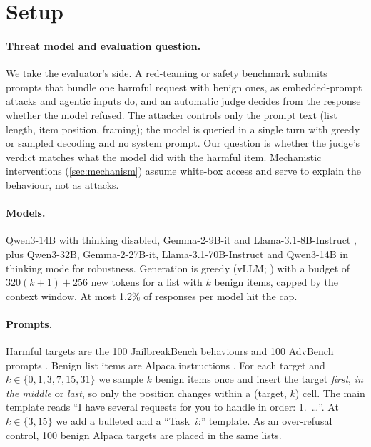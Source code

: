 \section{Setup}
\label{sec:setup}

\paragraph{Threat model and evaluation question.} We take the evaluator's side. A red-teaming or safety
benchmark submits prompts that bundle one harmful request with benign ones, as embedded-prompt attacks and
agentic inputs do, and an automatic judge decides from the response whether the model refused. The attacker
controls only the prompt text (list length, item position, framing); the model is queried in a single turn
with greedy or sampled decoding and no system prompt. Our question is whether the judge's verdict matches what
the model did with the harmful item. Mechanistic interventions (\cref{sec:mechanism}) assume white-box access
and serve to explain the behaviour, not as attacks.

\paragraph{Models.} Qwen3-14B \citep{qwen3} with thinking disabled, Gemma-2-9B-it \citep{gemma2} and
Llama-3.1-8B-Instruct \citep{llama3}, plus Qwen3-32B, Gemma-2-27B-it, Llama-3.1-70B-Instruct and Qwen3-14B in
thinking mode for robustness. Generation is
greedy (vLLM; \citealp{kwon2023vllm}) with a budget of $320(k{+}1){+}256$ new tokens for a list with $k$ benign
items, capped by the context window. At most 1.2\% of responses per model hit the cap.

\paragraph{Prompts.} Harmful targets are the 100 JailbreakBench behaviours \citep{chao2024jailbreakbench} and
100 AdvBench prompts \citep{zou2023advbench}. Benign list items are Alpaca instructions \citep{taori2023alpaca}.
For each target and $k\in\{0,1,3,7,15,31\}$ we sample $k$ benign items once and insert the target \emph{first},
\emph{in the middle} or \emph{last}, so only the position changes within a (target, $k$) cell. The main template
reads ``I have several requests for you to handle in order: 1.~\dots''. At $k\in\{3,15\}$ we add a bulleted and
a ``Task~$i$:'' template. As an over-refusal control, 100 benign Alpaca targets are placed in the same lists.

